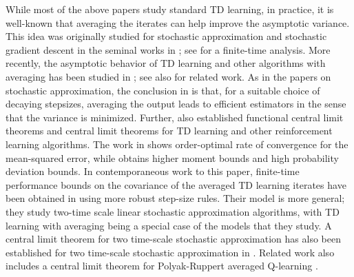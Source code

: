 \documentclass[11pt]{article}
\begin{document}
While most of the above papers study standard TD learning, in practice, it is well-known that averaging the iterates can help improve the asymptotic variance. This idea was originally studied for stochastic approximation and stochastic gradient descent in the seminal works in \citep{ruppert1988efficient,polyak1990new,polyak1992acceleration}; see \citep{moulines2011non} for a finite-time analysis. More recently, the asymptotic behavior of TD learning and other algorithms with averaging has been studied in \citep{borkar2021ode,mou2021optimal,durmus2022finite}; see also \citep{li2023online} for related work. As in the papers on stochastic approximation, the conclusion in \citep{borkar2021ode} is that, for a suitable choice of decaying stepsizes, averaging the output leads to efficient estimators in the sense that the variance is minimized. Further, \citep{borkar2021ode} also established functional central limit theorems and central limit theorems for TD learning and other reinforcement learning algorithms. The work in \citep{mou2021optimal} shows order-optimal rate of convergence for the mean-squared error, while \citep{durmus2022finite} obtains higher moment bounds and high probability deviation bounds. In contemporaneous work to this paper, finite-time performance bounds on the covariance of the averaged TD learning iterates have been obtained in \citep{haque2023tight} using more robust step-size rules. Their model is more general; they study two-time scale linear stochastic approximation algorithms, with TD learning with averaging being a special case of the models that they study. A central limit theorem for two time-scale stochastic approximation has also been established for two time-scale stochastic approximation in \citep{hu2024central}. Related work also includes a central limit theorem for Polyak-Ruppert averaged Q-learning \citep{li2023statistical}.
\end{document}
